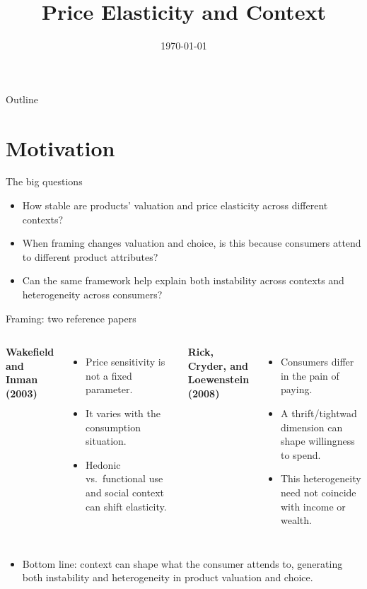 \documentclass[10pt]{beamer}   %
\title{Price Elasticity and Context}
\date{\today}
\begin{document}
\begin{frame}[plain]\titlepage\end{frame}
\begin{frame}{Outline}\tableofcontents\end{frame}

\section{Motivation}

\begin{frame}{The big questions}
  \begin{itemize}
    \item How stable are products' valuation and price elasticity across different contexts?
    \item When framing changes valuation and choice, is this because consumers attend to different product attributes?
    \item Can the same framework help explain both instability across contexts and heterogeneity across consumers?
  \end{itemize}
\end{frame}

\begin{frame}{Framing: two reference papers}
  \begin{columns}[T]
    \textbf{Wakefield and Inman (2003)}
    \begin{itemize}
      \item Price sensitivity is not a fixed parameter.
      \item It varies with the consumption situation.
      \item Hedonic vs.\ functional use and social context can shift elasticity.
    \end{itemize}

    \textbf{Rick, Cryder, and Loewenstein (2008)}
    \begin{itemize}
      \item Consumers differ in the pain of paying.
      \item A thrift/tightwad dimension can shape willingness to spend.
      \item This heterogeneity need not coincide with income or wealth.
    \end{itemize}
  \end{columns}

  \vspace{0.3cm}
  \begin{itemize}
    \item Bottom line: context can shape what the consumer attends to, generating both instability and heterogeneity in product valuation and choice.
  \end{itemize}
\end{frame}
\end{document}
